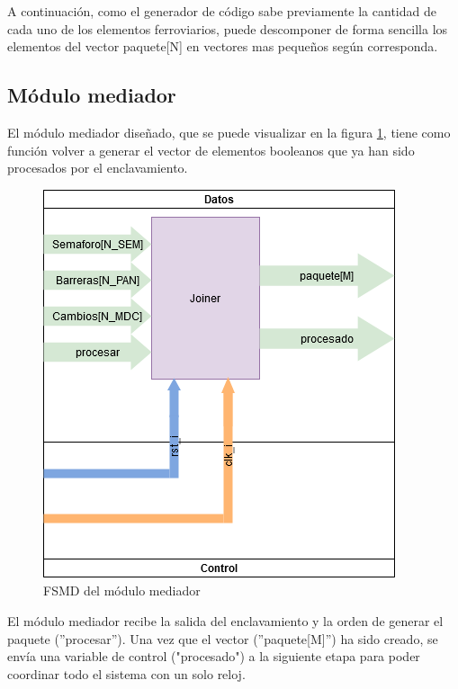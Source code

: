 		\vspace{5cm}
		
		A continuación, como el generador de código sabe previamente la cantidad de cada uno de los elementos ferroviarios, puede descomponer de forma sencilla los elementos del vector paquete[N] en vectores mas pequeños según corresponda.
		
	\subsection{Módulo mediador}
	
		El módulo mediador diseñado, que se puede visualizar en la figura \ref{fig:FSMD_Mediador}, tiene como función volver a generar el vector de elementos booleanos que ya han sido procesados por el enclavamiento.
		
		\begin{figure}[hbt]
		\centering
			\includegraphics[scale=.48]{./Figures/FSMD-Mediador}
			\caption{FSMD del módulo mediador}
			\label{fig:FSMD_Mediador}
		\end{figure}
		
		\vspace{10cm}
		
		El módulo mediador recibe la salida del enclavamiento y la orden de generar el paquete (''procesar''). Una vez que el vector (''paquete[M]'') ha sido creado, se envía una variable de control ("procesado") a la siguiente etapa para poder coordinar todo el sistema con un solo reloj.

